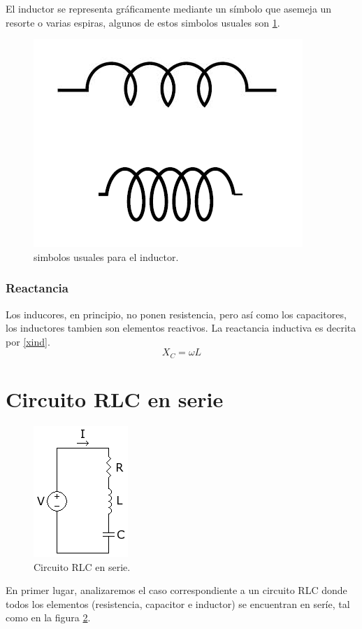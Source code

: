 \documentclass[letterpaper,12pt]{article} %
\begin{document}
El inductor se representa gráficamente mediante un símbolo que asemeja un resorte o varias espiras, algunos de estos simbolos usuales son \ref{fig:indsym}.

\begin{figure}[h]
\includegraphics[scale=0.5]{indsym.png}
\centering
\caption{simbolos usuales para el inductor.}
\label{fig:indsym}
\end{figure}

\subsubsection*{Reactancia}
Los inducores, en principio, no ponen resistencia, pero así como los capacitores, los inductores tambien son elementos reactivos. La reactancia inductiva es decrita por \ref{xind}.
\begin{equation}
X_C=\omega L
\label{xind}
\end{equation}

\section*{Circuito RLC en serie}

\begin{figure}
\includegraphics[scale=0.8]{rlcserie.png}
\centering
\caption{Circuito RLC en serie.}
\label{fig:rlcserie}
\end{figure}
En primer lugar, analizaremos el caso correspondiente a un circuito RLC donde todos los elementos (resistencia, capacitor e inductor) se encuentran en seríe, tal como en la figura \ref{fig:rlcserie}.\\ \\
\end{document}

